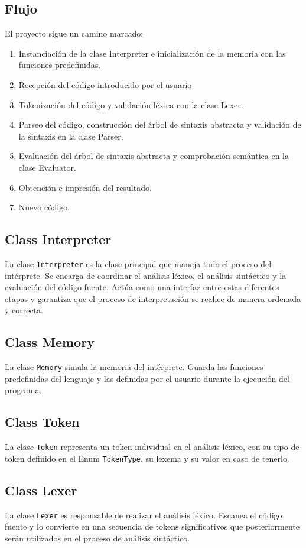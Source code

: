 \documentclass[12pt,a4paper]{article}
\begin{document}
\subsection{Flujo}\label{sub:flow}
El proyecto sigue un camino marcado:
\begin{enumerate}
	\item Instanciación de la clase Interpreter e inicialización de la memoria con las funciones predefinidas.
	\item Recepción del código introducido por el usuario
	\item Tokenización del código y validación léxica con la clase Lexer.
	\item Parseo del código, construcción del árbol de sintaxis abstracta y validación de la sintaxis en la clase Parser.
	\item Evaluación del árbol de sintaxis abstracta y comprobación semántica en la clase Evaluator.
	\item Obtención e impresión del resultado.
	\item Nuevo código.
\end{enumerate}

\subsection{Class Interpreter}
La clase \texttt{Interpreter} es la clase principal que maneja todo el proceso del intérprete. Se encarga de coordinar el análisis léxico, el análisis sintáctico y la evaluación del código fuente. Actúa como una interfaz entre estas diferentes etapas y garantiza que el proceso de interpretación se realice de manera ordenada y correcta.
\subsection{Class Memory}
La clase \texttt{Memory} simula la memoria del intérprete. Guarda las funciones predefinidas del lenguaje y las definidas por el usuario durante la ejecución del programa.
\subsection{Class Token}
La clase \texttt{Token} representa un token individual en el análisis léxico, con su tipo de token definido en el Enum \texttt{TokenType}, su lexema y su valor en caso de tenerlo.
\subsection{Class Lexer}
La clase \texttt{Lexer} es responsable de realizar el análisis léxico. Escanea el código fuente y lo convierte en una secuencia de tokens significativos que posteriormente serán utilizados en el proceso de análisis sintáctico.
\end{document}
